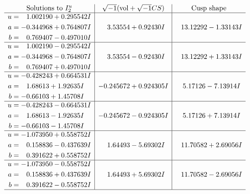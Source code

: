 \documentclass[1p]{elsarticle_modified}
\theoremstyle{definition}
\newcommand{\I}{\sqrt{-1}}
\begin{document}
$$\begin{array}{c|c|c}  
\text{Solutions to }I^u_{2}& \I (\text{vol} + \sqrt{-1}CS) & \text{Cusp shape}\\
 \hline 
\begin{aligned}
u &= \phantom{-}1.002190 + 0.295542 I \\
a &= -0.344968 + 0.764807 I \\
b &= \phantom{-}0.769407 - 0.497010 I\end{aligned}
 & \phantom{-}3.53554 + 0.92430 I & \phantom{-}13.12292 - 1.33143 I \\ \hline\begin{aligned}
u &= \phantom{-}1.002190 - 0.295542 I \\
a &= -0.344968 - 0.764807 I \\
b &= \phantom{-}0.769407 + 0.497010 I\end{aligned}
 & \phantom{-}3.53554 - 0.92430 I & \phantom{-}13.12292 + 1.33143 I \\ \hline\begin{aligned}
u &= -0.428243 + 0.664531 I \\
a &= \phantom{-}1.68613 + 1.92635 I \\
b &= -0.66103 + 1.45708 I\end{aligned}
 & -0.245672 + 0.924305 I & \phantom{-}5.17126 - 7.13914 I \\ \hline\begin{aligned}
u &= -0.428243 - 0.664531 I \\
a &= \phantom{-}1.68613 - 1.92635 I \\
b &= -0.66103 - 1.45708 I\end{aligned}
 & -0.245672 - 0.924305 I & \phantom{-}5.17126 + 7.13914 I \\ \hline\begin{aligned}
u &= -1.073950 + 0.558752 I \\
a &= \phantom{-}0.158836 - 0.437639 I \\
b &= \phantom{-}0.391622 + 0.558752 I\end{aligned}
 & \phantom{-}1.64493 - 5.69302 I & \phantom{-}11.70582 + 2.69056 I \\ \hline\begin{aligned}
u &= -1.073950 - 0.558752 I \\
a &= \phantom{-}0.158836 + 0.437639 I \\
b &= \phantom{-}0.391622 - 0.558752 I\end{aligned}
 & \phantom{-}1.64493 + 5.69302 I & \phantom{-}11.70582 - 2.69056 I\\
 \hline 
 \end{array}$$\newpage\newpage\renewcommand{\arraystretch}{1}
\end{document}
